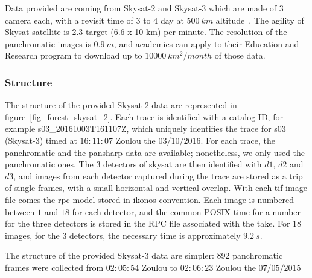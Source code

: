 \documentclass[paper=a4, fontsize=11pt, onecolumn, tikz, dvipsnames, svgnames, x11names]{article}
\begin{document}
Data provided are coming from Skysat-2 and Skysat-3 which are made of 3 camera each, with a revisit time of $3$ to $4$ day at $500~km$ altitude~\cite{planet_product}. The agility of Skysat satellite is 2.3 target (6.6 x 10 km) per minute. The resolution of the panchromatic images is $0.9~m$, and academics can apply to their Education and Research program to download up to $10000~km^2/month$ of those data.

\subsubsection{Structure}

The structure of the provided Skysat-2 data are represented in figure~\ref{fig_forest_skysat_2}. Each trace is identified with a catalog ID, for example s03\_20161003T161107Z, which uniquely identifies the trace for s03 (Skysat-3) timed at $16:11:07$ Zoulou the $03/10/2016$. For each trace, the panchromatic and the pansharp data are available; nonetheless, we only used the panchromatic ones. The 3 detectors of skysat are then identified with $d1$, $d2$ and $d3$, and images from each detector captured during the trace are stored as a trip of single frames, with a small horizontal and vertical overlap. With each tif image file comes the rpc model stored in ikonos convention. Each image is numbered between $1$ and $18$ for each detector, and the common POSIX time for a number for the three detectors is stored in the RPC file associated with the take. For 18 images, for the 3 detectors, the necessary time is approximately $9.2~s$.

The structure of the provided Skysat-3 data are simpler: 892 panchromatic frames were collected from $02:05:54$ Zoulou to $02:06:23$ Zoulou the $07/05/2015$
\end{document}
